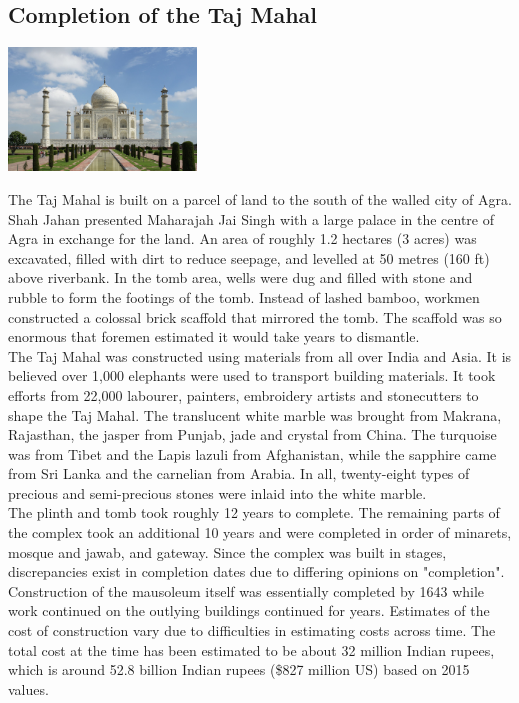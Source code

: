\documentclass[11pt]{report}
\begin{document}
\subsection{Completion of the Taj Mahal}
\vspace{2mm}\begin{center}\includegraphics[width=5cm]{./img/tajMahal.jpeg}\end{center}
The Taj Mahal is built on a parcel of land to the south of the walled city of Agra. Shah Jahan presented Maharajah Jai Singh with a large palace in the centre of Agra in exchange for the land. An area of roughly 1.2 hectares (3 acres) was excavated, filled with dirt to reduce seepage, and levelled at 50 metres (160 ft) above riverbank. In the tomb area, wells were dug and filled with stone and rubble to form the footings of the tomb. Instead of lashed bamboo, workmen constructed a colossal brick scaffold that mirrored the tomb. The scaffold was so enormous that foremen estimated it would take years to dismantle.\\
\indent The Taj Mahal was constructed using materials from all over India and Asia. It is believed over 1,000 elephants were used to transport building materials. It took efforts from 22,000 labourer, painters, embroidery artists and stonecutters to shape the Taj Mahal. The translucent white marble was brought from Makrana, Rajasthan, the jasper from Punjab, jade and crystal from China. The turquoise was from Tibet and the Lapis lazuli from Afghanistan, while the sapphire came from Sri Lanka and the carnelian from Arabia. In all, twenty-eight types of precious and semi-precious stones were inlaid into the white marble.\\
\indent The plinth and tomb took roughly 12 years to complete. The remaining parts of the complex took an additional 10 years and were completed in order of minarets, mosque and jawab, and gateway. Since the complex was built in stages, discrepancies exist in completion dates due to differing opinions on "completion". Construction of the mausoleum itself was essentially completed by 1643 while work continued on the outlying buildings continued for years. Estimates of the cost of construction vary due to difficulties in estimating costs across time. The total cost at the time has been estimated to be about 32 million Indian rupees, which is around 52.8 billion Indian rupees (\$827 million US) based on 2015 values.
\end{document}

